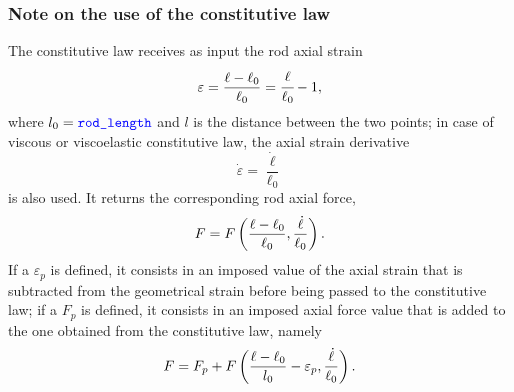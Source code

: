 \subsubsection{Note on the use of the constitutive law}
The constitutive law  receives as input the rod axial strain
\begin{equation}
	\varepsilon = \frac{\ell - \ell_0}{\ell_0} = \cfrac{\ell}{\ell_0} - 1 ,
\end{equation}
where $l_0=\textcolor{blue}{\texttt{rod\_length}}$ and $l$ is the distance between the two points;
in case of viscous or viscoelastic constitutive law, the axial strain derivative
\begin{equation}
	\dot{\varepsilon} = \frac{\dot{\ell}}{\ell_0}
\end{equation}
is also used.
It returns the corresponding rod axial force,
\begin{displaymath}
	F = F\left( \frac{\ell - \ell_0}{\ell_0}, \frac{\dot{\ell}}{\ell_0} \right) .
\end{displaymath}
If a  $\varepsilon_p$ is defined,
it consists in an imposed value of the axial strain
that is subtracted from the geometrical strain
before being passed to the constitutive law;
if a  $F_p$ is defined,
it consists in an imposed axial force value
that is added to the one obtained from the constitutive law,
namely
\begin{displaymath}
	F = F_p + F\left( \frac{\ell - \ell_0}{l_0} - \varepsilon_p, \frac{\dot{\ell}}{\ell_0} \right) .
\end{displaymath}

